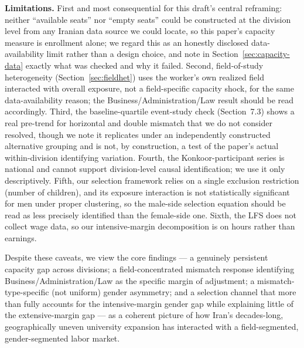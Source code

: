 \documentclass[11pt]{article}
\begin{document}
\textbf{Limitations.} First and most consequential for this draft's central reframing: neither ``available seats'' nor ``empty seats'' could be constructed at the division level from any Iranian data source we could locate, so this paper's capacity measure is enrollment alone; we regard this as an honestly disclosed data-availability limit rather than a design choice, and note in Section~\ref{sec:capacity-data} exactly what was checked and why it failed. Second, field-of-study heterogeneity (Section~\ref{sec:fieldhet}) uses the worker's own realized field interacted with overall exposure, not a field-specific capacity shock, for the same data-availability reason; the Business/Administration/Law result should be read accordingly. Third, the baseline-quartile event-study check (Section~7.3) shows a real pre-trend for horizontal and double mismatch that we do not consider resolved, though we note it replicates under an independently constructed alternative grouping and is not, by construction, a test of the paper's actual within-division identifying variation. Fourth, the Konkoor-participant series is national and cannot support division-level causal identification; we use it only descriptively. Fifth, our selection framework relies on a single exclusion restriction (number of children), and its exposure interaction is not statistically significant for men under proper clustering, so the male-side selection equation should be read as less precisely identified than the female-side one. Sixth, the LFS does not collect wage data, so our intensive-margin decomposition is on hours rather than earnings.

Despite these caveats, we view the core findings --- a genuinely persistent capacity gap across divisions; a field-concentrated mismatch response identifying Business/Administration/Law as the specific margin of adjustment; a mismatch-type-specific (not uniform) gender asymmetry; and a selection channel that more than fully accounts for the intensive-margin gender gap while explaining little of the extensive-margin gap --- as a coherent picture of how Iran's decades-long, geographically uneven university expansion has interacted with a field-segmented, gender-segmented labor market.
\end{document}
